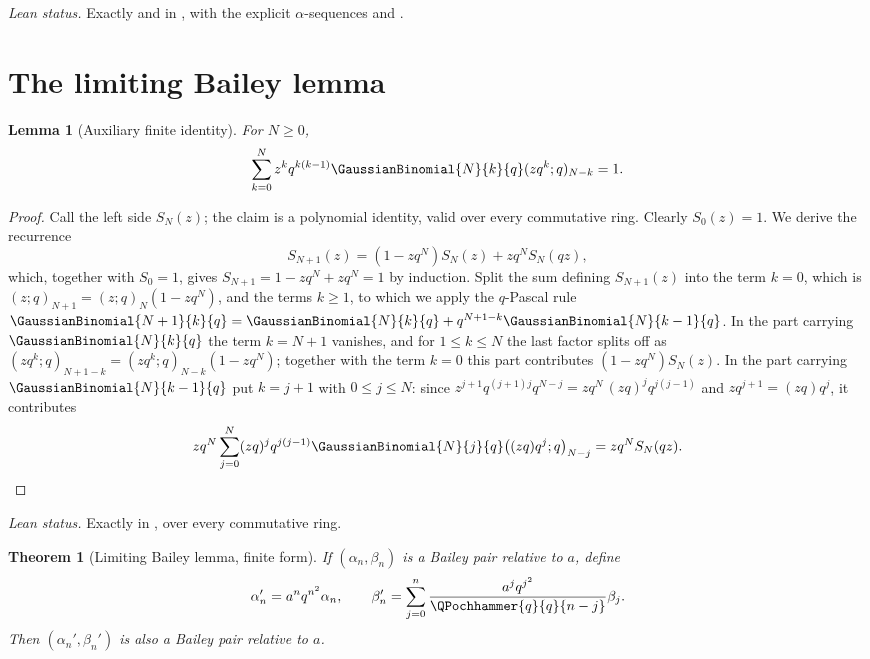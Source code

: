 \documentclass[11pt,a4paper,oneside,openany]{book}
\newtheorem{theorem}{Theorem}[chapter]
\newtheorem{lemma}[lemma]{Lemma}
\theoremstyle{definition}
\theoremstyle{remark}
\begin{document}
\emph{Lean status.}  Exactly  and
 in , with the explicit
$\alpha$-sequences  and .


\section{The limiting Bailey lemma}

\begin{lemma}[Auxiliary finite identity]\label{lem:bailey-aux}
For $N\ge0$,
\[
 \sum_{k=0}^{N}z^kq^{k(k-1)}\GaussianBinomial{N}{k}{q}
 (zq^k;q)_{N-k}=1.
\]
\end{lemma}

\begin{proof}
Call the left side $S_N(z)$; the claim is a polynomial identity, valid over
every commutative ring.  Clearly $S_0(z)=1$.  We derive the recurrence
\[
 S_{N+1}(z)=(1-zq^N)S_N(z)+zq^NS_N(qz),
\]
which, together with $S_0=1$, gives $S_{N+1}=1-zq^N+zq^N=1$ by induction.
Split the sum defining $S_{N+1}(z)$ into the term $k=0$, which is
$(z;q)_{N+1}=(z;q)_N(1-zq^N)$, and the terms $k\ge1$, to which we apply the
$q$-Pascal rule
$\GaussianBinomial{N+1}{k}{q}=\GaussianBinomial{N}{k}{q}+q^{N+1-k}\GaussianBinomial{N}{k-1}{q}$.
In the part carrying $\GaussianBinomial{N}{k}{q}$ the term $k=N+1$ vanishes,
and for $1\le k\le N$ the last factor splits off as
$(zq^k;q)_{N+1-k}=(zq^k;q)_{N-k}(1-zq^N)$; together with the term $k=0$
this part contributes $(1-zq^N)S_N(z)$.  In the part carrying
$\GaussianBinomial{N}{k-1}{q}$ put $k=j+1$ with $0\le j\le N$: since
$z^{j+1}q^{(j+1)j}q^{N-j}=zq^N\,(zq)^jq^{j(j-1)}$ and $zq^{j+1}=(zq)q^j$,
it contributes
\[
 zq^N\sum_{j=0}^{N}(zq)^jq^{j(j-1)}\GaussianBinomial{N}{j}{q}
 \bigl((zq)q^j;q\bigr)_{N-j}=zq^NS_N(qz).
\]
\end{proof}

\emph{Lean status.}  Exactly  in , over every
commutative ring.


\begin{theorem}[Limiting Bailey lemma, finite form]\label{thm:bailey-limit-finite}
If $(\alpha_n,\beta_n)$ is a Bailey pair relative to $a$, define
\[
 \alpha_n'=a^nq^{n^2}\alpha_n,
 \qquad
 \beta_n'=\sum_{j=0}^{n}
 \frac{a^jq^{j^2}}{\QPochhammer{q}{q}{n-j}}\beta_j.
\]
Then $(\alpha_n',\beta_n')$ is also a Bailey pair relative to $a$.
\end{theorem}
\end{document}
